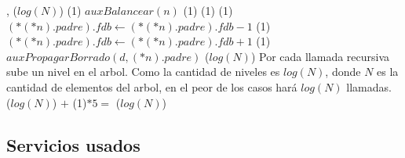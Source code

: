 {   ,
    }
{}
{\bigo($log(N)$)}
{                             \comment \bigo(1)
        \State $auxBalancear(n)$                                        \comment \bigo(1)
    \EndIf
                                           \comment \bigo(1)
                                        \comment \bigo(1)
            \State $(*(*n).padre).fdb \gets (*(*n).padre).fdb - 1$      \comment \bigo(1)
        \Else
            \State $(*(*n).padre).fdb \gets (*(*n).padre).fdb + 1$      \comment \bigo(1)
        \EndIf
        \State $auxPropagarBorrado(d, (*n).padre)$                      \comment \bigo($log(N)$)
    \EndIf
}
{   Por cada llamada recursiva sube un nivel en el arbol. Como la cantidad de niveles es
    $log(N)$, donde $N$ es la cantidad de elementos del arbol, en el peor de los casos
    hará $log(N)$ llamadas. \\
    \hspace*{8em} \bigo($log(N)$) $+$ \bigo(1)$*5 =$ \bigo($log(N)$) }


\subsection{Servicios usados}



